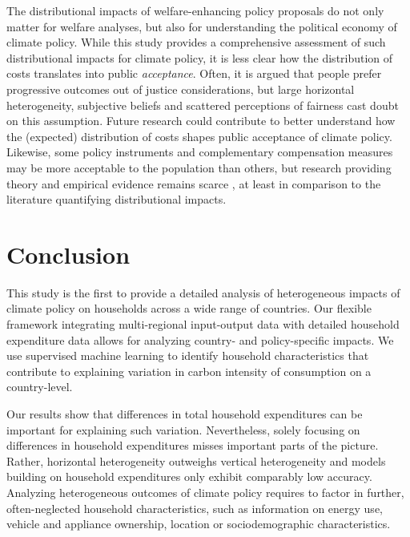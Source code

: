 \documentclass[12pt, a4paper]{article}
\begin{document}
The distributional impacts of welfare-enhancing policy proposals do not only matter for welfare analyses, but also for understanding the political economy of climate policy. While this study provides a comprehensive assessment of such distributional impacts for climate policy, it is less clear how the distribution of costs translates into public \textit{acceptance}. Often, it is argued that people prefer progressive outcomes out of justice considerations, but large horizontal heterogeneity, subjective beliefs \autocite{Douenne.2020} and scattered perceptions of fairness \autocite{MaestreAndres.2019,Povitkina.2021} cast doubt on this assumption. Future research could contribute to better understand how the (expected) distribution of costs shapes public acceptance of climate policy. Likewise, some policy instruments and complementary compensation measures may be more acceptable to the population than others, but research providing theory and empirical evidence remains scarce \autocite[e.g.,][]{Sommer.2022,Valencia.2023}, at least in comparison to the literature quantifying distributional impacts. 

\section{Conclusion} \label{sec:conclusion}

This study is the first to provide a detailed analysis of heterogeneous impacts of climate policy on households across a wide range of countries. Our flexible framework integrating multi-regional input-output data with detailed household expenditure data allows for analyzing country- and policy-specific impacts. We use supervised machine learning to identify household characteristics that contribute to explaining variation in carbon intensity of consumption on a country-level.

Our results show that differences in total household expenditures can be important for explaining such variation. Nevertheless, solely focusing on differences in household expenditures misses important parts of the picture. Rather, horizontal heterogeneity outweighs vertical heterogeneity and models building on household expenditures only exhibit comparably low accuracy. Analyzing heterogeneous outcomes of climate policy requires to factor in further, often-neglected household characteristics, such as information on energy use, vehicle and appliance ownership, location or sociodemographic characteristics.
\end{document}
